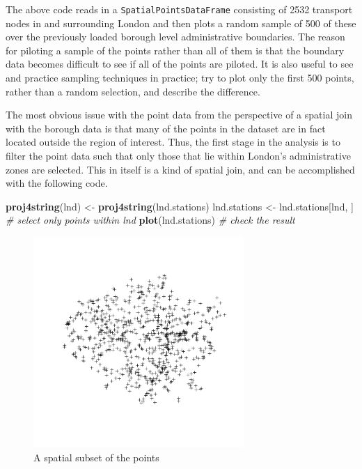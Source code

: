 \documentclass[]{article}
\newenvironment{Shaded}{}{}
\newcommand{\KeywordTok}[1]{\textcolor[rgb]{0.00,0.44,0.13}{\textbf{{#1}}}}
\newcommand{\CommentTok}[1]{\textcolor[rgb]{0.38,0.63,0.69}{\textit{{#1}}}}
\newcommand{\NormalTok}[1]{{#1}}
\let\Oldincludegraphics\includegraphics
\renewcommand{\includegraphics}[1]{\Oldincludegraphics[width=8cm]{#1}}
\begin{document}
The above code reads in a \texttt{SpatialPointsDataFrame} consisting of
2532 transport nodes in and surrounding London and then plots a random
sample of 500 of these over the previously loaded borough level
administrative boundaries. The reason for piloting a sample of the
points rather than all of them is that the boundary data becomes
difficult to see if all of the points are piloted. It is also useful to
see and practice sampling techniques in practice; try to plot only the
first 500 points, rather than a random selection, and describe the
difference.

The most obvious issue with the point data from the perspective of a
spatial join with the borough data is that many of the points in the
dataset are in fact located outside the region of interest. Thus, the
first stage in the analysis is to filter the point data such that only
those that lie within London's administrative zones are selected. This
in itself is a kind of spatial join, and can be accomplished with the
following code.

\begin{Shaded}
\begin{Highlighting}[]
\KeywordTok{proj4string}\NormalTok{(lnd) <- }\KeywordTok{proj4string}\NormalTok{(lnd.stations)}
\NormalTok{lnd.stations <- lnd.stations[lnd, ]  }\CommentTok{# select only points within lnd}
\KeywordTok{plot}\NormalTok{(lnd.stations)  }\CommentTok{# check the result}
\end{Highlighting}
\end{Shaded}
\begin{figure}[htbp]
\centering
\includegraphics{figure/A_spatial_subset_of_the_points.png}
\caption{A spatial subset of the points}
\end{figure}
\end{document}
